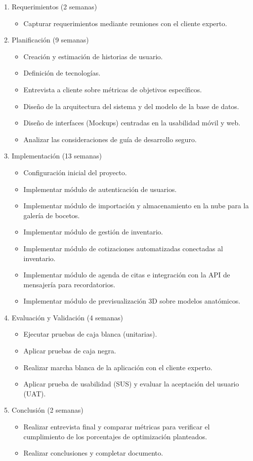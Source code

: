\begin{enumerate}
  \item Requerimientos (2 semanas)
  \begin{itemize}
    \item Capturar requerimientos mediante reuniones con el cliente experto.
  \end{itemize}
  \item Planificación (9 semanas)
  \begin{itemize}
    \item Creación y estimación de historias de usuario.
    \item Definición de tecnologías.
    \item Entrevista a cliente sobre métricas de objetivos específicos.
    \item Diseño de la arquitectura del sistema y del modelo de la base de datos.
    \item Diseño de interfaces (Mockups) centradas en la usabilidad móvil y web.
    \item Analizar las consideraciones de guía de desarrollo seguro.
  \end{itemize}
  \item Implementación (13 semanas)
  \begin{itemize}
    \item Configuración inicial del proyecto.
    \item Implementar módulo de autenticación de usuarios.
    \item Implementar módulo de importación y almacenamiento en la nube para la galería de bocetos.
    \item Implementar módulo de gestión de inventario.
    \item Implementar módulo de cotizaciones automatizadas conectadas al inventario.
    \item Implementar módulo de agenda de citas e integración con la API de mensajería para recordatorios.
    \item Implementar módulo de previsualización 3D sobre modelos anatómicos.
  \end{itemize}
  \item Evaluación y Validación (4 semanas)
  \begin{itemize}
    \item Ejecutar pruebas de caja blanca (unitarias).
    \item Aplicar pruebas de caja negra.
    \item Realizar marcha blanca de la aplicación con el cliente experto.
    \item Aplicar prueba de usabilidad (SUS) y evaluar la aceptación del usuario (UAT).
  \end{itemize}
  \item Conclusión (2 semanas)
  \begin{itemize}
    \item Realizar entrevista final y comparar métricas para verificar el cumplimiento de los porcentajes de optimización planteados.
    \item Realizar conclusiones y completar documento.
  \end{itemize}
\end{enumerate}

